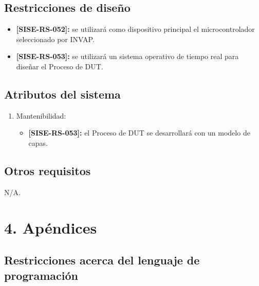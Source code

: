 \documentclass[
11pt, %
codirector, %
]{charter}
\def\codigo{SISE-RS}
\newcommand{\req}[1]{\textbf{[\codigo-#1]:}}
\begin{document}
\subsection{Restricciones de diseño}
\label{sub:restriccionesDiseño}

\begin{itemize}
	\item \req{052} se utilizará como dispositivo principal el microcontrolador seleccionado por INVAP.
	\item \req{053} se utilizará un sistema operativo de tiempo real para diseñar el Proceso de DUT.
\end{itemize}

\subsection{Atributos del sistema}
\label{sub:atributos}

\begin{enumerate}
	\item Mantenibilidad:
	\begin{itemize}
		\item \req{053} el Proceso de DUT se desarrollará con un modelo de capas.
	\end{itemize}
\end{enumerate}

\subsection{Otros requisitos}
\label{sub:otros}

N/A.

\section{4. Apéndices}
\label{sec:apendices}



\subsection{Restricciones acerca del lenguaje de programación}
\end{document}

